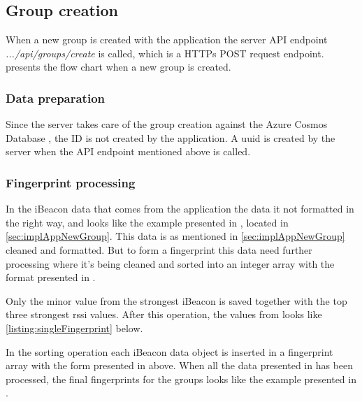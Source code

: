 \subsection{Group creation}\label{sec:implServerGroupCreation}
When a new group is created with the application the server API endpoint \textit{.../api/groups/create} is called, which is a HTTPs POST request \cite{POSTHTTPMDN} endpoint.
 presents the flow chart when a new group is created.



\subsubsection{Data preparation}\label{sec:implServerGroupCreationDataPrep}
Since the server takes care of the group creation against the Azure Cosmos Database \cite{IntroductionAzureCosmos}, the ID is not created by the application.
A \acrfull{uuid} \cite{CommonsIdUUID} is created by the server when the API endpoint mentioned above is called.


\subsubsection{Fingerprint processing}\label{sec:implServerGroupCreationFingerprint}

In the iBeacon data that comes from the application the data it not formatted in the right way, and looks like the example presented in , located in \cref{sec:implAppNewGroup}.
This data is as mentioned in \cref{sec:implAppNewGroup} cleaned and formatted.
But to form a fingerprint this data need further processing where it's being cleaned and sorted into an integer array with the format presented in .

\bigskip

Only the minor value from the strongest iBeacon is saved together with the top three strongest \acrshort{rssi} values. After this operation, the values from  looks like \cref{listing:singleFingerprint} below.


In the sorting operation each iBeacon data object is inserted in a fingerprint array with the form presented in  above.
When all the data presented in   has been processed, the final fingerprints for the groups looks like the example presented in .

